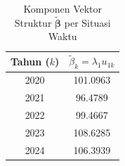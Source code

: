 \begin{table}[H]
\centering
\small
\caption{Komponen Vektor Struktur $\tilde{\boldsymbol{\beta}}$ per Situasi Waktu} \label{tab:app1beta_vec}
\begin{tabular}{|c|c|}
\hline
\textbf{Tahun ($k$)} & \textbf{$\tilde{\beta}_k = \lambda_1 u_{1k}$} \\
\hline
2020 & 101.0963 \\
2021 & 96.4789 \\
2022 & 99.4667 \\
2023 & 108.6285 \\
2024 & 106.3939 \\
\hline
\end{tabular}
\end{table}